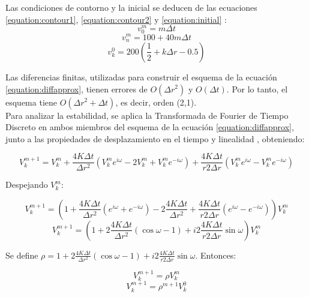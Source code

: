 \documentclass[journal, monochrome]{IEEEtran}
\begin{document}
Las condiciones de contorno y la inicial se deducen de las ecuaciones \eqref{equation:contour1}, \eqref{equation:contour2} y \eqref{equation:initial} :
\begin{equation}
v_{0}^{m} = m\Delta t 
\label{equation:vcontour1}
\end{equation}
\begin{equation}
v_{n}^{m} = 100 + 40m\Delta t 
\label{equation:vcontour2}
\end{equation}
\begin{equation}
v_{k}^{0} = 200(\frac{1}{2}+k\Delta r - 0.5) 
\label{equation:vinitial}
\end{equation}

Las diferencias finitas, utilizadas para construir el esquema de la ecuación \eqref{equation:diffapprox}, tienen errores de $O(\Delta r^{2})$ y $O(\Delta t)$. Por lo tanto, el esquema tiene $O(\Delta r^{2} + \Delta t)$, es decir, orden (2,1). \\

Para analizar la estabilidad, se aplica la Transformada de Fourier de Tiempo Discreto en ambos miembros del esquema de la ecuación \eqref{equation:diffapprox}, junto a las propiedades de desplazamiento en el tiempo y linealidad \citep{mathews}, obteniendo:

\begin{equation}
V_{k}^{m+1} = V_{k}^{m} + \frac{4K\Delta t}{\Delta r^{2}} (V_{k}^{m} e^{i\omega}- 2V_{k}^{m} + V_{k}^{m} e^{-i\omega}) + \frac{4K\Delta t}{r 2\Delta r} (V_{k}^{m} e^{i\omega} - V_{k}^{m} e^{-i\omega})
\end{equation}

Despejando $V_{k}^{m}$:

\begin{equation}
V_{k}^{m+1} = (1 + \frac{4K\Delta t}{\Delta r^{2}} (e^{i\omega} + e^{-i\omega}) - 2\frac{4K\Delta t}{\Delta r^{2}} + \frac{4K\Delta t}{r 2\Delta r} (e^{i\omega} - e^{-i\omega})) V_{k}^{m}
\end{equation}
\begin{equation}
V_{k}^{m+1} = (1 + 2 \frac{4K\Delta t}{\Delta r^{2}}(\cos \omega - 1) + i 2 \frac{4K\Delta t}{r 2\Delta r} \sin \omega) V_{k}^{m}
\end{equation}

Se define $\rho = 1 + 2 \frac{4K\Delta t}{\Delta r^{2}}(\cos \omega - 1) + i 2 \frac{4K\Delta t}{r 2\Delta r} \sin \omega$. Entonces:

\begin{equation}
V_{k}^{m+1} = \rho V_{k}^{m}
\end{equation}
\begin{equation}
V_{k}^{m+1} = \rho^{m+1} V_{k}^{0}
\end{equation}
\end{document}
